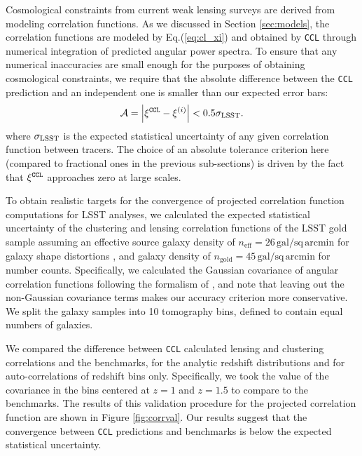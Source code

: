 \documentclass[\docopts]{\docclass}
\newcommand{\ccl}{{\tt CCL}\xspace}
\begin{document}
Cosmological constraints from current weak lensing surveys are derived from modeling correlation functions. As we discussed in Section \ref{sec:models}, the correlation functions are modeled by Eq.(\ref{eq:cl_xi}) and obtained by \ccl through numerical integration of predicted angular power spectra. To ensure that any numerical inaccuracies are small enough for the purposes of obtaining cosmological constraints, we require that the absolute difference between the \ccl prediction and an independent one is smaller than our expected error bars:
\begin{equation}
  \mathcal{A}=\left|\xi^{\tt CCL}-\xi^{(i)}\right|<0.5\sigma_{\rm LSST}.
\end{equation}
where $\sigma_{\rm LSST}$ is the expected statistical uncertainty of any given correlation function between tracers. The choice of an absolute tolerance criterion here (compared to fractional ones in the previous sub-sections) is driven by the fact that $\xi^{\tt CCL}$ approaches zero at large scales.

To obtain realistic targets for the convergence of projected correlation function computations for LSST analyses, we calculated the expected statistical uncertainty of the clustering and lensing correlation functions of the LSST gold sample \citep{LSSTSB} assuming an effective source galaxy density of $n_\mathrm{eff} = 26\,\mathrm{gal/sq\,arcmin}$ for galaxy shape distortions \citep{Chang13}, and galaxy density of $n_\mathrm{gold} = 45\,\mathrm{gal/sq\,arcmin}$ for number counts. Specifically, we calculated the Gaussian covariance of angular correlation functions following the formalism of \citet{2008A&A...477...43J}, and note that leaving out the non-Gaussian covariance terms makes our accuracy criterion more conservative. We split the galaxy samples into 10 tomography bins, defined to contain equal numbers of galaxies.

We compared the difference between \ccl calculated lensing and clustering correlations and the benchmarks, for the analytic redshift distributions and for auto-correlations of redshift bins only. Specifically, we took the value of the covariance in the bins centered at $z=1$ and $z=1.5$ to compare to the benchmarks. The results of this validation procedure for the projected correlation function are shown in Figure \ref{fig:corrval}. Our results suggest that the convergence between \ccl predictions and benchmarks is below the expected statistical uncertainty. 
\end{document}
